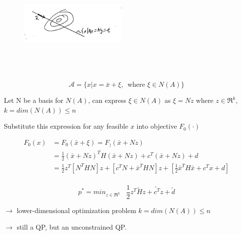 \begin{figure}
	\centering
	\includegraphics[width=2.1in,height=2.1in]{figures/ch07/figure1016_b.png}
\end{figure}

\begin{equation*}
\mathcal{A} =\{x | x = \bar{x} + \xi,\,\,\, \text{where } \xi \in N(A) \}
\end{equation*}

Let N be a basis for $N(A)$, can express $\xi \in N(A)$ as $\xi = Nz$ where $z\in \Re^k$, $k =dim(N(A)) \leq n$


Substitute this expression for any feasible $x$ into objective $F_0(\cdot)$


\begin{align*}
F_0(x) &= F_0(\bar{x} + \xi) = F_)(\bar{x} + Nz)\\
&= \frac{1}{2}(\bar{x} + Nz)^TH(\bar{x}+Nz) + c^T(\bar{x} + Nz) + d\\
&= \frac{1}{2}z^T[N^THN]z + [c^TN + \bar{x}^THN]z + [\frac{1}{2}\bar{x}^TH\bar{x} + c^Tx + d] \\
\end{align*}

\begin{equation*}
p^* = min_{z\in \Re^k}\,\,\,\,\, \frac{1}{2}z^T\tilde{H}z + \tilde{c^T}z + \tilde{d}
\end{equation*}

$\rightarrow$ lower-dimensional optimization problem $k =dim(N(A)) \leq n $

$\rightarrow$ still a QP, but an unconstrained QP.



